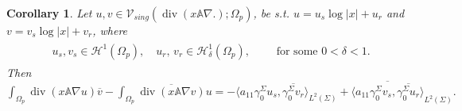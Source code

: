 \documentclass[report]{elsarticle}
\newtheorem{corollary}[theorem]{Corollary}
\numberwithin{theorem}{section}
\begin{document}
\begin{corollary}
	\label{cor:green}
	Let $u, v\in \mathcal{V}_{sing}(\operatorname{div}(x\mathbb{A}\nabla.); \Omega_{p})$,  be s.t. $u=u_s\log|x|+u_r$ and $v=v_s\log|x|+v_r$, where
	\begin{eqnarray}
		\label{eq:cond}
		\begin{split}
			&u_s, v_s\in \mathcal{H}^1(\Omega_p), \quad u_r, \, v_r\in \mathcal{H}^1_{\delta}(\Omega_p),\qquad \text{ for some }0<\delta<1.	
		\end{split}
	\end{eqnarray}	
	Then $
	\int_{\Omega_p}\operatorname{div}( x  \mathbb{A}\nabla u)\overline{v}-\int_{\Omega_p}\overline{\operatorname{div}( x \mathbb{A}\nabla v)}{u}=-\langle a_{11}\gamma_{0}^{\Sigma} u_s, \overline{\gamma_{0}^{\Sigma} v_{r}}\rangle_{L^2(\Sigma)}+\overline{\langle a_{11}\gamma_{0}^{\Sigma} v_s, \overline{\gamma_{0}^{\Sigma} u_{r}}\rangle}_{L^2(\Sigma)}.		$
\end{corollary}
\end{document}
